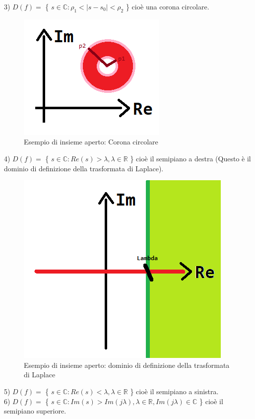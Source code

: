 3) $ D(f) = $ \{ $ s \in \mathbb{C} : \rho_{1} < |s-s_{0}| < \rho_{2} $ \} cioè una corona circolare. \\
\begin{figure}[h]
	\centering
	\includegraphics[scale=0.75]{immagini/coronaCircolare}
	\caption{ Esempio di insieme aperto: Corona circolare }
	\label{fig: coronaCircolare}
\end{figure}


4) $ D(f) = $ \{ $ s \in \mathbb{C} : Re(s)> \lambda, \lambda \in \mathbb{R} $ \} cioè il semipiano a destra (Questo è il dominio di definizione della trasformata di Laplace). \\

\begin{figure}[h]
	\centering
	\includegraphics[scale=0.75]{immagini/dominioDefLaplace}
	\caption{ Esempio di insieme aperto: dominio di definizione della trasformata di Laplace }
	\label{fig: dominioDefLaplace}
\end{figure}

5) $D(f) = $ \{ $ s \in \mathbb{C} : Re(s)< \lambda, \lambda \in \mathbb{R} $ \} cioè il semipiano a sinistra. \\ 
6) $D(f) = $ \{ $ s \in \mathbb{C} : Im(s) > Im(j\lambda ), \lambda \in \mathbb{R}, Im(j\lambda ) \in \mathbb{C} $ \} cioè il semipiano superiore. \\

